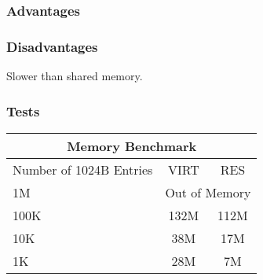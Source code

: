\subsubsection{Advantages}

\subsubsection{Disadvantages}

Slower than shared memory.

\subsubsection{Tests}




\begin{tabular}{| l | c | c |}
\hline
\multicolumn{3}{|c|}{Memory Benchmark} \\
\hline
Number of 1024B Entries & VIRT &  RES\\
\hline
\hline
1M & \multicolumn{2}{|c|}{Out of Memory} \\
\hline
100K & 132M & 112M\\ 
\hline
10K & 38M & 17M\\ 
\hline
1K & 28M & 7M\\ 
\hline
\end{tabular}


